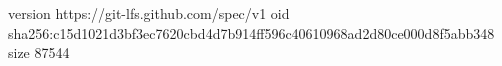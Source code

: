 version https://git-lfs.github.com/spec/v1
oid sha256:c15d1021d3bf3ec7620cbd4d7b914ff596c40610968ad2d80ce000d8f5abb348
size 87544
